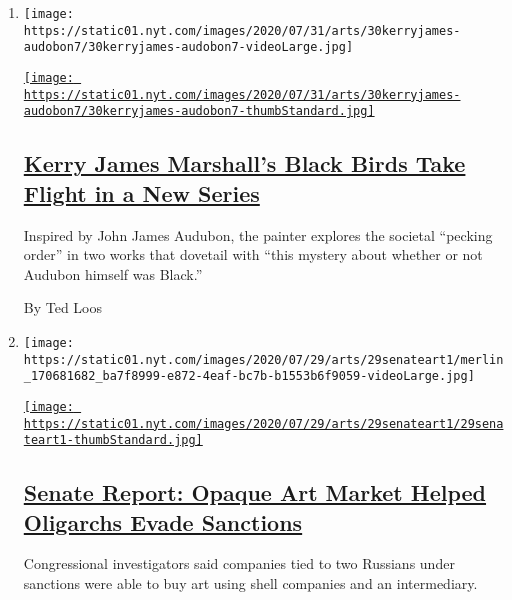 \begin{enumerate}
\def\labelenumi{\arabic{enumi}.}
\item
  \texttt{[image: https://static01.nyt.com/images/2020/07/31/arts/30kerryjames-audobon7/30kerryjames-audobon7-videoLarge.jpg]}

  \href{/2020/07/29/arts/design/kerry-james-marshall-audubon.html}{\texttt{[image: https://static01.nyt.com/images/2020/07/31/arts/30kerryjames-audobon7/30kerryjames-audobon7-thumbStandard.jpg]}}

  \hypertarget{kerry-james-marshalls-black-birds-take-flight-in-a-new-series}{%
  \subsection{\texorpdfstring{\href{/2020/07/29/arts/design/kerry-james-marshall-audubon.html}{Kerry
  James Marshall's Black Birds Take Flight in a New
  Series}}{Kerry James Marshall's Black Birds Take Flight in a New Series}}\label{kerry-james-marshalls-black-birds-take-flight-in-a-new-series}}

  Inspired by John James Audubon, the painter explores the societal
  ``pecking order'' in two works that dovetail with ``this mystery about
  whether or not Audubon himself was Black.''

  By Ted Loos
\item
  \texttt{[image: https://static01.nyt.com/images/2020/07/29/arts/29senateart1/merlin\_170681682\_ba7f8999-e872-4eaf-bc7b-b1553b6f9059-videoLarge.jpg]}

  \href{/2020/07/29/arts/design/senate-report-art-market-russia-oligarchs-sanctions.html}{\texttt{[image: https://static01.nyt.com/images/2020/07/29/arts/29senateart1/29senateart1-thumbStandard.jpg]}}

  \hypertarget{senate-report-opaque-art-market-helped-oligarchs-evade-sanctions}{%
  \subsection{\texorpdfstring{\href{/2020/07/29/arts/design/senate-report-art-market-russia-oligarchs-sanctions.html}{Senate
  Report: Opaque Art Market Helped Oligarchs Evade
  Sanctions}}{Senate Report: Opaque Art Market Helped Oligarchs Evade Sanctions}}\label{senate-report-opaque-art-market-helped-oligarchs-evade-sanctions}}

  Congressional investigators said companies tied to two Russians under
  sanctions were able to buy art using shell companies and an
  intermediary.


\end{enumerate}
